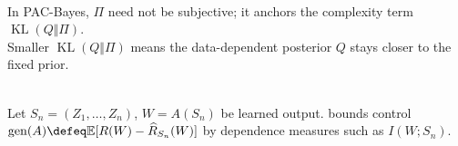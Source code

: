 \begin{remark} \label{rem:sl-pac-bayes-prior-posterior} \\
In PAC-Bayes, $\Pi$ need not be subjective; it anchors the complexity term $\operatorname{KL}(Q\Vert\Pi)$.\\
Smaller $\operatorname{KL}(Q\Vert\Pi)$ means the data-dependent posterior $Q$ stays closer to the fixed prior.
\end{remark}

\begin{definition} \label{def:sl-information-generalization-gap} \\
Let $S_n=(Z_1,\ldots,Z_n)$, $W=A(S_n)$ be learned output.  bounds control $\operatorname{gen}(A)\defeq\mathbb{E}[R(W)-\widehat{R}_{S_n}(W)]$ by dependence measures such as $I(W;S_n)$.
\end{definition}
